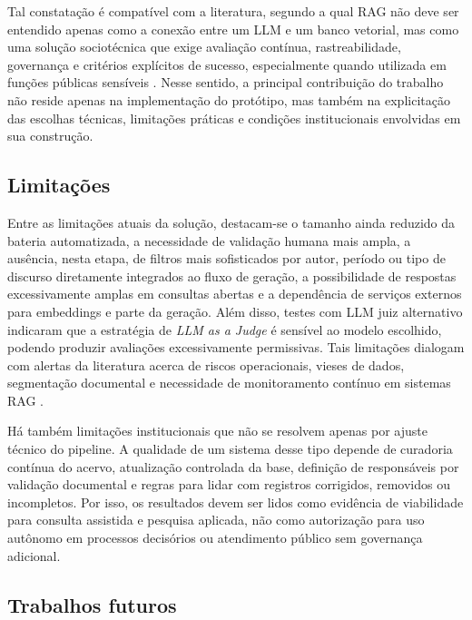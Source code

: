 Tal constatação é compatível com a literatura, segundo a qual RAG não deve ser entendido apenas como a conexão entre um LLM e um banco vetorial, mas como uma solução sociotécnica que exige avaliação contínua, rastreabilidade, governança e critérios explícitos de sucesso, especialmente quando utilizada em funções públicas sensíveis \parencite{gao2023ragSurvey,deAlmeidaSantos2025aiGovernance,saadFalconEtAl2024ares}. Nesse sentido, a principal contribuição do trabalho não reside apenas na implementação do protótipo, mas também na explicitação das escolhas técnicas, limitações práticas e condições institucionais envolvidas em sua construção.

\subsection{Limitações}

Entre as limitações atuais da solução, destacam-se o tamanho ainda reduzido da bateria automatizada, a necessidade de validação humana mais ampla, a ausência, nesta etapa, de filtros mais sofisticados por autor, período ou tipo de discurso diretamente integrados ao fluxo de geração, a possibilidade de respostas excessivamente amplas em consultas abertas e a dependência de serviços externos para embeddings e parte da geração. Além disso, testes com LLM juiz alternativo indicaram que a estratégia de \textit{LLM as a Judge} é sensível ao modelo escolhido, podendo produzir avaliações excessivamente permissivas. Tais limitações dialogam com alertas da literatura acerca de riscos operacionais, vieses de dados, segmentação documental e necessidade de monitoramento contínuo em sistemas RAG \parencite{gao2023ragSurvey,wangEtAl2025segmentation,liuEtAl2025judgeRag}.

Há também limitações institucionais que não se resolvem apenas por ajuste técnico do pipeline. A qualidade de um sistema desse tipo depende de curadoria contínua do acervo, atualização controlada da base, definição de responsáveis por validação documental e regras para lidar com registros corrigidos, removidos ou incompletos. Por isso, os resultados devem ser lidos como evidência de viabilidade para consulta assistida e pesquisa aplicada, não como autorização para uso autônomo em processos decisórios ou atendimento público sem governança adicional.

\subsection{Trabalhos futuros}


